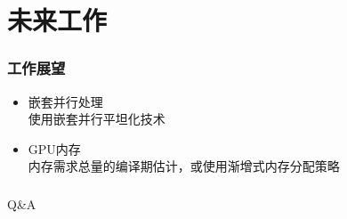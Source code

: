 \documentclass[]{beamer}
\begin{document}
\frame{\tableofcontents[currentsection]}

\section{未来工作}
\frame{\tableofcontents[currentsection]}

\begin{frame}
  \frametitle{工作展望}
  \begin{itemize}
    \item 嵌套并行处理\\
      使用嵌套并行平坦化技术
    \item GPU内存\\
      内存需求总量的编译期估计，或使用渐增式内存分配策略
  \end{itemize}
\end{frame}

\begin{frame}
  \frametitle{}
  \centerline{\huge Q\&A}
\end{frame}
\end{document}
